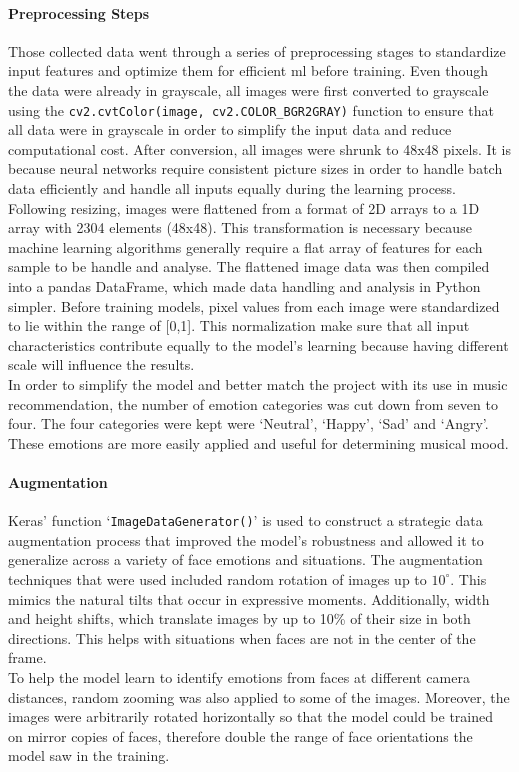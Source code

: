 \paragraph{Preprocessing Steps}
Those collected data went through a series of preprocessing stages to standardize input features and optimize them for efficient \gls{ml} before training.
Even though the data were already in grayscale, all images were first converted to grayscale using the \texttt{cv2.cvtColor(image, cv2.COLOR\_BGR2GRAY)} function to ensure that all data were in grayscale in order to simplify the input data and reduce computational cost.
After conversion, all images were shrunk to 48x48 pixels.
It is because neural networks require consistent picture sizes in order to handle batch data efficiently and handle all inputs equally during the learning process.
\\
\indent Following resizing, images were flattened from a format of 2D arrays to a 1D array with 2304 elements (48x48). 
This transformation is necessary because machine learning algorithms generally require a flat array of features for each sample to be handle and analyse.
The flattened image data was then compiled into a pandas DataFrame, which made data handling and analysis in Python simpler.
Before training models, pixel values from each image were standardized to lie within the range of [0,1]. 
This normalization make sure that all input characteristics contribute equally to the model's learning because having different scale will influence the results.
\\
\indent In order to simplify the model and better match the project with its use in music recommendation, the number of emotion categories was cut down from seven to four.
The four categories were kept were `Neutral', `Happy', `Sad' and `Angry'.
These emotions are more easily applied and useful for determining musical mood.
\paragraph{Augmentation}
Keras' function `\texttt{ImageDataGenerator()}' is used to construct a strategic data augmentation process that improved the model's robustness and allowed it to generalize across a variety of face emotions and situations.
The augmentation techniques that were used included random rotation of images up to \(10^\circ\).
This mimics the natural tilts that occur in expressive moments.
Additionally, width and height shifts, which translate images by up to 10\% of their size in both directions.
This helps with situations when faces are not in the center of the frame.
\\
\indent To help the model learn to identify emotions from faces at different camera distances, random zooming was also applied to some of the images.
Moreover, the images were arbitrarily rotated horizontally so that the model could be trained on mirror copies of faces, therefore double the range of face orientations the model saw in the training.
